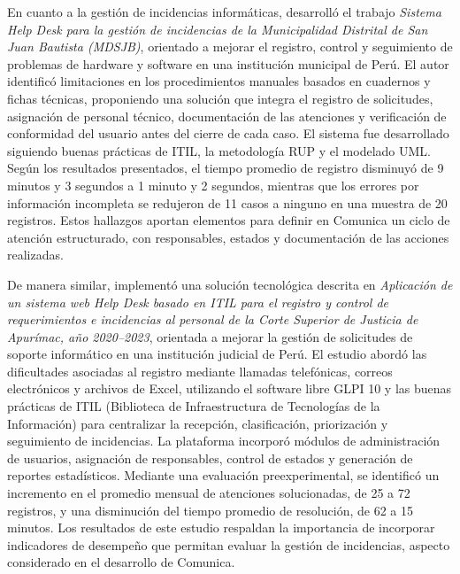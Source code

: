 En cuanto a la gestión de incidencias informáticas, \textcite{noriegasistema} desarrolló el trabajo \textit{Sistema Help Desk para la gestión de incidencias de la Municipalidad Distrital de San Juan Bautista (MDSJB)}, orientado a mejorar el registro, control y seguimiento de problemas de hardware y software en una institución municipal de Perú. El autor identificó limitaciones en los procedimientos manuales basados en cuadernos y fichas técnicas, proponiendo una solución que integra el registro de solicitudes, asignación de personal técnico, documentación de las atenciones y verificación de conformidad del usuario antes del cierre de cada caso. El sistema fue desarrollado siguiendo buenas prácticas de ITIL, la metodología RUP y el modelado UML. Según los resultados presentados, el tiempo promedio de registro disminuyó de 9 minutos y 3 segundos a 1 minuto y 2 segundos, mientras que los errores por información incompleta se redujeron de 11 casos a ninguno en una muestra de 20 registros. Estos hallazgos aportan elementos para definir en Comunica un ciclo de atención estructurado, con responsables, estados y documentación de las acciones realizadas.

De manera similar, \textcite{soel2024aplicacion} implementó una solución tecnológica descrita en \textit{Aplicación de un sistema web Help Desk basado en ITIL para el registro y control de requerimientos e incidencias al personal de la Corte Superior de Justicia de Apurímac, año 2020--2023}, orientada a mejorar la gestión de solicitudes de soporte informático en una institución judicial de Perú. El estudio abordó las dificultades asociadas al registro mediante llamadas telefónicas, correos electrónicos y archivos de Excel, utilizando el software libre GLPI 10 y las buenas prácticas de ITIL (Biblioteca de Infraestructura de Tecnologías de la Información) para centralizar la recepción, clasificación, priorización y seguimiento de incidencias. La plataforma incorporó módulos de administración de usuarios, asignación de responsables, control de estados y generación de reportes estadísticos. Mediante una evaluación preexperimental, se identificó un incremento en el promedio mensual de atenciones solucionadas, de 25 a 72 registros, y una disminución del tiempo promedio de resolución, de 62 a 15 minutos. Los resultados de este estudio respaldan la importancia de incorporar indicadores de desempeño que permitan evaluar la gestión de incidencias, aspecto considerado en el desarrollo de Comunica.

